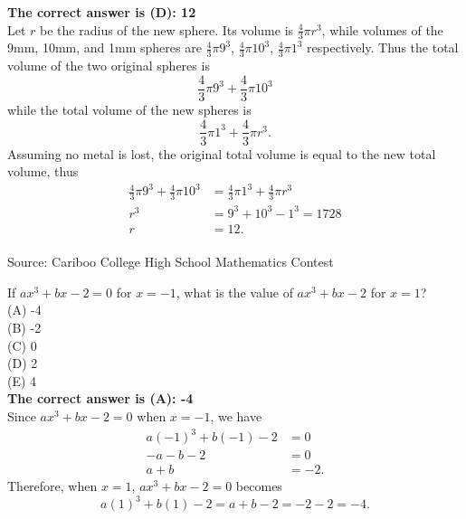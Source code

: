 \documentclass{article}
\begin{document}
\textbf{The correct answer is (D): 12}\\[1 ex]
Let $r$ be the radius of the new sphere. Its volume is $\frac{4}{3}\pi r^3$, while volumes of the 9mm, 10mm, and 1mm spheres are $\frac{4}{3}\pi 9^3$, $\frac{4}{3}\pi 10^3$, $\frac{4}{3}\pi 1^3$
respectively. Thus the total volume of the two original spheres is
\begin{equation*}
\frac{4}{3}\pi 9^3+\frac{4}{3}\pi 10^3
\end{equation*}
while the total volume of the new spheres is
\begin{equation*}
\frac{4}{3}\pi 1^3+\frac{4}{3}\pi r^3.
\end{equation*}
Assuming no metal is lost, the original total volume is equal to the new total volume, thus
\begin{align*}
\frac{4}{3}\pi 9^3+\frac{4}{3}\pi 10^3&=\frac{4}{3}\pi 1^3+\frac{4}{3}\pi r^3\\
r^{3}&=9^{3}+10^{3}-1^{3}=1728\\
r&=12.
\end{align*}
\\[5 ex]

\scriptsize
Source: Cariboo College High School Mathematics Contest

\normalsize
If $ax^{3}+bx-2=0$ for $x=-1$, what is the value of $ax^{3}+bx-2$ for $x=1$?\\
(A) -4\\
(B) -2\\
(C) 0\\
(D) 2\\
(E) 4\\


\textbf{The correct answer is (A): -4}\\[1 ex]
Since $ax^{3}+bx-2=0$ when $x=-1$, we have
\begin{align*}
a(-1)^{3}+b(-1)-2&=0\\
-a-b-2&=0\\
a+b&=-2.
\end{align*}
Therefore, when $x=1$, $ax^{3}+bx-2=0$ becomes
\begin{equation*}
a(1)^{3}+b(1)-2=a+b-2=-2-2=-4.
\end{equation*}
\\[5 ex]
\end{document}
